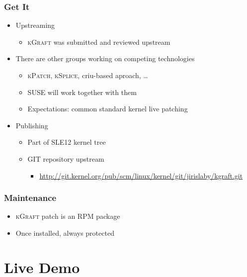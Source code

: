\documentclass[xcolor=dvipsnames,handout]{beamer}
\newcommand\kgr{\textsc{kGraft}\xspace}
\begin{document}
\begin{frame}
  \frametitle{Get It}

  \begin{itemize}
    \item Upstreaming
    \begin{itemize}
      \item \kgr was submitted and reviewed upstream
    \end{itemize}

    \pause

    \item There are other groups working on competing technologies
    \begin{itemize}
      \item \textsc{kPatch}, \textsc{kSplice}, criu-based aproach, \dots
      \item SUSE will work together with them
      \item Expectations: common standard kernel live patching
    \end{itemize}

    \pause

    \item Publishing
    \begin{itemize}
      \item Part of SLE12 kernel tree
      \item GIT repository upstream
      \begin{itemize}
	\item \url{http://git.kernel.org/pub/scm/linux/kernel/git/jirislaby/kgraft.git}
      \end{itemize}
    \end{itemize}
  \end{itemize}

\end{frame}

\begin{frame}
  \frametitle{Maintenance}

  \begin{itemize}
    \item \kgr patch is an RPM package
    \item Once installed, always protected
  \end{itemize}

\end{frame}

\section{Live Demo}
\end{document}
